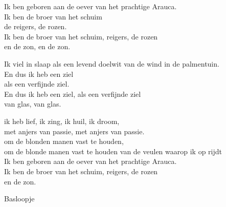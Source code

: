 \clearpage
\begin{translation}
Ik ben geboren aan de oever van het prachtige Arauca.\\
Ik ben de broer van het schuim\\
de reigers, de rozen.\\
Ik ben de broer van het schuim, reigers, de rozen\\
en de zon, en de zon.\vspace{\wlskip}

Ik viel in slaap als een levend doelwit van de wind in de palmentuin.\\
En dus ik heb een ziel\\
als een verfijnde ziel.\\
En dus ik heb een ziel, als een verfijnde ziel\\
van glas, van glas.\vspace{\wlskip}

ik heb lief, ik zing, ik huil, ik droom,\\
met anjers van passie, met anjers van passie.\\
om de blonden manen vast te houden,\\
om de blonde manen vast te houden van de veulen waarop ik op rijdt\\
Ik ben geboren aan de oever van het prachtige Arauca.\\
Ik ben de broer van het schuim, reigers, de rozen\\
en de zon.
\end{translation}

\begin{instrumental}{Basloopje}
     
     
     
     
  \\


      
\end{instrumental}
